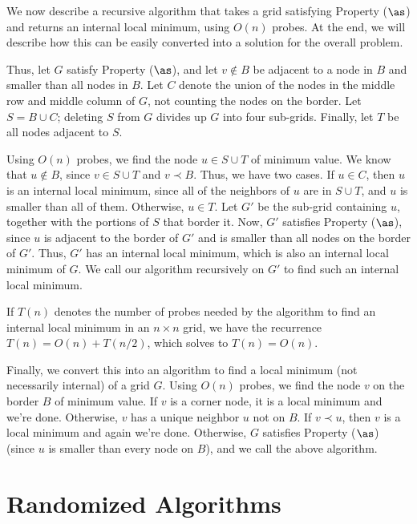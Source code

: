 \documentclass[12pt]{article}
\begin{document}
\begin{enumerate}
{We now describe a recursive algorithm that takes a grid
satisfying Property ($\as$) and returns an internal local minimum,
using $O(n)$ probes.
At the end, we will describe how this can be easily converted
into a solution for the overall problem.

Thus, let $G$ satisfy Property ($\as$), and let 
$v \not\in B$ be adjacent to a node in $B$ 
and smaller than all nodes in $B$.
Let $C$ denote the union of the nodes in the middle row
and middle column of $G$, not counting the nodes on the border.
Let $S = B \cup C$; deleting $S$ from $G$ divides up 
$G$ into four sub-grids.
Finally, let $T$ be all nodes adjacent to $S$.

Using $O(n)$ probes, we find the node $u \in S \cup T$
of minimum value.
We know that $u \not\in B$, since $v \in S \cup T$
and $v \prec B$.
Thus, we have two cases.
If $u \in C$, then $u$ is an internal local minimum,
since all of the neighbors of $u$ are in $S \cup T$,
and $u$ is smaller than all of them.
Otherwise, $u \in T$.
Let $G'$ be the sub-grid containing $u$, together
with the portions of $S$ that border it.
Now, $G'$ satisfies Property ($\as$), since $u$ is
adjacent to the border of $G'$ and is smaller
than all nodes on the border of $G'$.
Thus, $G'$ has an internal local minimum,
which is also an internal local minimum of $G$.
We call our algorithm recursively on $G'$ to find such
an internal local minimum.

If $T(n)$ denotes the number of probes needed by the algorithm to 
find an internal local minimum in an $n \times n$ grid, 
we have the recurrence $T(n) = O(n) + T(n/2)$, which solves to
$T(n) = O(n)$.

Finally, we convert this into an algorithm to find a local
minimum (not necessarily internal) of a grid $G$.
Using $O(n)$ probes, we find the node $v$ on the border $B$
of minimum value.
If $v$ is a corner node, it is a local minimum and we're done.
Otherwise, $v$ has a unique neighbor $u$ not on $B$.
If $v \prec u$, then $v$ is a local minimum and again we're done.
Otherwise, $G$ satisfies Property ($\as$) (since $u$ 
is smaller than every node on $B$), and we call the above algorithm.

}

\end{enumerate}


\section{Randomized Algorithms}
\end{document}
